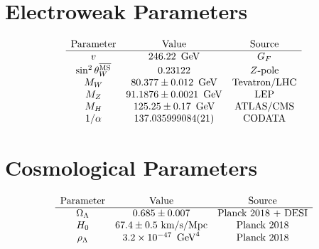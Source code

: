 \section{Electroweak Parameters}

\[
\begin{array}{ccc}
\text{Parameter} & \text{Value} & \text{Source} \\
\hline
v & 246.22\ \,\text{GeV} & G_F \\
\sin^2\theta_W^{\overline{\text{MS}}} & 0.23122 & Z\text{-pole} \\
M_W & 80.377 \pm 0.012\ \,\text{GeV} & \text{Tevatron/LHC} \\
M_Z & 91.1876 \pm 0.0021\ \,\text{GeV} & \text{LEP} \\
M_H & 125.25 \pm 0.17\ \,\text{GeV} & \text{ATLAS/CMS} \\
1/\alpha & 137.035999084(21) & \text{CODATA} \\
\end{array}
\]

\section{Cosmological Parameters}

\[
\begin{array}{ccc}
\text{Parameter} & \text{Value} & \text{Source} \\
\hline
\Omega_\Lambda & 0.685 \pm 0.007 & \text{Planck 2018 + DESI} \\
H_0 & 67.4 \pm 0.5\ \text{km/s/Mpc} & \text{Planck 2018} \\
\rho_\Lambda & 3.2 \times 10^{-47}\ \,\text{GeV}^4 & \text{Planck 2018} \\
\end{array}
\]
